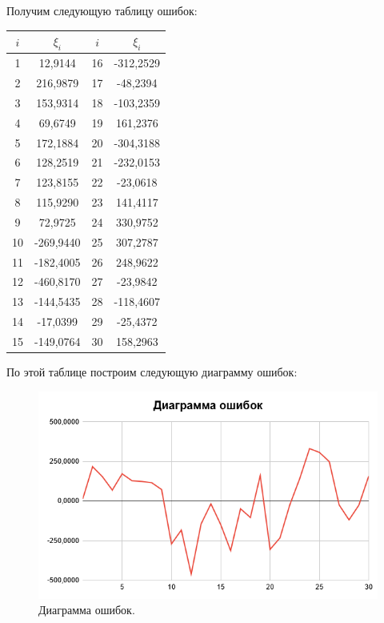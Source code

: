 \documentclass[utf8, a4paper, 14pt, russian, oneside]{book}
\begin{document}
Получим следующую таблицу ошибок:
\begin{table}[h!]
    \centering
    \begin{tabular}{|c|c|c|c|}
        \hline
        $i$ & $\xi_i$ & $i$ & $\xi_i$ \\ \hline
        1 & 12,9144    & 16 & -312,2529 \\ \hline
        2 & 216,9879   & 17 &  -48,2394 \\ \hline
        3 & 153,9314   & 18 & -103,2359 \\ \hline
        4 & 69,6749    & 19 &  161,2376 \\ \hline
        5 & 172,1884   & 20 & -304,3188 \\ \hline
        6 & 128,2519   & 21 & -232,0153 \\ \hline
        7 & 123,8155   & 22 &  -23,0618 \\ \hline
        8 & 115,9290   & 23 &  141,4117 \\ \hline
        9 & 72,9725    & 24 &  330,9752 \\ \hline
        10 & -269,9440 & 25 &  307,2787 \\ \hline
        11 & -182,4005 & 26 &  248,9622 \\ \hline
        12 & -460,8170 & 27 &  -23,9842 \\ \hline
        13 & -144,5435 & 28 & -118,4607 \\ \hline
        14 & -17,0399  & 29 &  -25,4372 \\ \hline
        15 & -149,0764 & 30 &  158,2963 \\ \hline
    \end{tabular} 
\end{table}

\newpage
По этой таблице построим следующую диаграмму ошибок:

\begin{figure}[h!]
    \centering
    \includegraphics{img/errors.png}
    \caption{Диаграмма ошибок.}
\end{figure}
\end{document}
